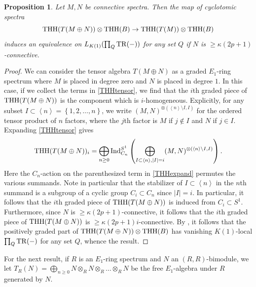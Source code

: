 \documentclass{amsart}
\newtheorem{proposition}[theorem]{Proposition}
\theoremstyle{definition}
\begin{document}
\begin{proposition} 
\label{lK1THHTR}
Let $M, N$ be connective spectra. 
Then the map of cyclotomic spectra
\[ \mathrm{THH}( T(M \oplus N)) \otimes \mathrm{THH}(B) \to \mathrm{THH}(T(M)) \otimes
\mathrm{THH}(B)  \]
induces an equivalence on $L_{K(1)} ( \prod_Q \mathrm{TR}(-))$ for any set $Q$ if $N$ is $\geq \kappa(2p+1)$-connective. 
\end{proposition} 
\begin{proof} 
We can consider the tensor algebra $T(M \oplus N)$ as a graded $E_1$-ring
spectrum where $M$ is placed in degree zero and $N$ is placed in degree $1$. 
In this case, 
if we collect the terms in \eqref{THHtensor}, 
we find that the $i$th graded piece of $\mathrm{THH}( T(M \oplus N))$ is the component
which is $i$-homogeneous. 
Explicitly, for any subset $ I \subset \left \langle n\right\rangle = \left\{1, 2, \dots,
n\right\}$, we write 
$(M, N)^{\otimes ( \left \langle n \right\rangle\setminus I, I)}$ for the ordered tensor
product of $n$ factors, where the $j$th factor is $M$ if $j \notin I$ and $N$ if
$j \in I$. 
Expanding \eqref{THHtensor} gives
\begin{equation} \label{THHexpand} \mathrm{THH}( T(M \oplus N))_i = \bigoplus_{n \geq 0}
\mathrm{Ind}_{C_n}^{S^1} \left(  \bigoplus_{I \subset \left \langle
n \right\rangle, |I| = i} (M, N)^{\otimes (\left \langle n \right\rangle\setminus I,
I)} \right). \end{equation} 
Here the $C_n$-action on the parenthesized term in \eqref{THHexpand} permutes
the various summands. 
Note in particular that  the stabilizer of $I \subset \left \langle
n\right\rangle$ in the
$n$th summand is a subgroup of a cyclic group $C_i \subset
C_n$ since $|I| = i$. 
In particular, it follows that the $i$th graded piece of $\mathrm{THH}( T(M \oplus N))$
is induced from $C_i \subset S^1$. 
Furthermore, since $N$ is $\geq \kappa(2p+1)$-connective, it follows that the $i$th
graded piece of $\mathrm{THH}( T( M \oplus N)) $ is $\geq \kappa(2p+1)i$-connective. 
By 
, it follows that the positively graded part of $\mathrm{THH}(T(M
\oplus N)) \otimes \mathrm{THH}(B)$ has vanishing $K(1)$-local $\prod_Q \mathrm{TR}(-)$ for any
set $Q$, whence
the result. 
\end{proof} 

For the next result, 
if $R$ is an $E_1$-ring spectrum and $N$ an $(R, R)$-bimodule, we 
let $T_R(N) = \bigoplus_{n \geq 0} N \otimes_R N \otimes_R \dots \otimes_R N$ be
the free $E_1$-algebra under $R$ generated by $N$. 
\end{document}
